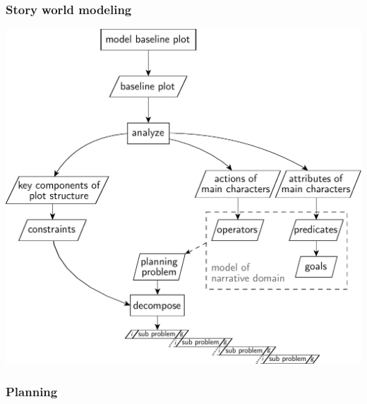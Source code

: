\subsubsection{Story world modeling}
\includegraphics[scale=0.6]{discourse_model}
\subsubsection{Planning}
